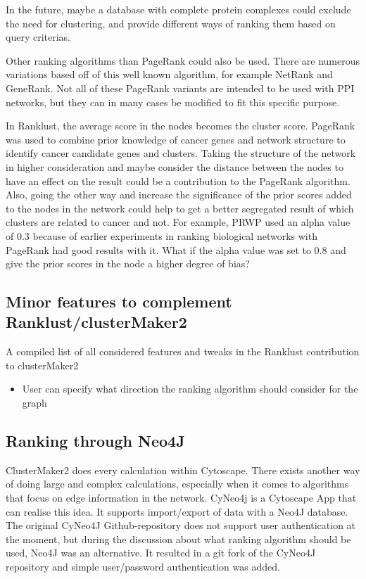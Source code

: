 In the future, maybe a database with complete protein complexes could exclude
the need for clustering, and provide different ways of ranking them based on
query criterias.

Other ranking algorithms than PageRank could also be used. There are numerous
variations based off of this well known algorithm, for example NetRank and
GeneRank\cite{netrank,generank}. Not all of these PageRank variants are intended
to be used with PPI networks, but they can in many cases be modified to fit this
specific purpose.

In Ranklust, the average score in the nodes becomes the cluster score. PageRank
was used to combine prior knowledge of cancer genes and network structure to
identify cancer candidate genes and clusters. Taking the structure of the
network in higher consideration and maybe consider the distance between the
nodes to have an effect on the result could be a contribution to the PageRank
algorithm. Also, going the other way and increase the significance of the prior
scores added to the nodes in the network could help to get a better segregated
result of which clusters are related to cancer and not. For example, PRWP used
an alpha value of 0.3 because of earlier experiments in ranking biological
networks with PageRank had good results with it. What if the alpha value was set
to 0.8 and give the prior scores in the node a higher degree of bias?

\subsection{Minor features to complement Ranklust/clusterMaker2}
A compiled list of all considered features and tweaks in the Ranklust
contribution to clusterMaker2

\begin{itemize}
    \item User can specify what direction the ranking algorithm should consider
        for the graph
\end{itemize}

\subsection{Ranking through Neo4J}
ClusterMaker2 does every calculation within Cytoscape. There exists another way
of doing large and complex calculations, especially when it comes to algorithms
that focus on edge information in the network. CyNeo4j\cite{cyneo4j} is
a Cytoscape App that can realise this idea. It supports import/export of data
with a Neo4J\cite{neo4j} database. The original CyNeo4J Github-repository does
not support user authentication at the moment, but during the discussion about
what ranking algorithm should be used, Neo4J was an alternative. It resulted in
a git fork\cite{git-fork} of the CyNeo4J repository and simple user/password
authentication was added.

